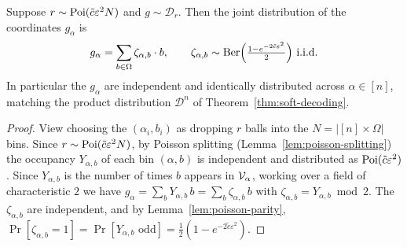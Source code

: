 \begin{lemma}
  \label{claim:poisson-decouple}
  Suppose $r \sim \operatorname{Poi}(\tilde c\varepsilon^2 N)$ and $g \sim \mathcal{D}_r$. Then
  the joint distribution of the coordinates $g_\alpha$ is
  \[
    g_\alpha = \sum_{b\in\Omega}\zeta_{\alpha,b}\cdot b,\qquad
    \zeta_{\alpha,b}\sim\operatorname{Ber}\!\Big(\tfrac{1 - e^{-2\tilde c\varepsilon^2}}{2}\Big)
    \text{ i.i.d.}
  \]
  In particular the $g_\alpha$ are independent and identically distributed across
  $\alpha\in[n]$, matching the product distribution $\mathcal{D}^n$ of
  Theorem~\ref{thm:soft-decoding}.
\end{lemma}
\begin{proof}
  View choosing the $(\alpha_i,b_i)$ as dropping $r$ balls into the
  $N = |[n]\times\Omega|$ bins. Since $r \sim \operatorname{Poi}(\tilde c\varepsilon^2 N)$, by
  Poisson splitting (Lemma~\ref{lem:poisson-splitting}) the occupancy
  $Y_{\alpha,b}$ of each bin $(\alpha,b)$ is independent and distributed as
  $\operatorname{Poi}(\tilde c\varepsilon^2)$. Since $Y_{\alpha,b}$ is the number of times $b$
  appears in $\mathcal{V}_\alpha$, working over a field of characteristic $2$ we have
  $g_\alpha = \sum_b Y_{\alpha,b}\,b = \sum_b \zeta_{\alpha,b}\,b$ with
  $\zeta_{\alpha,b} = Y_{\alpha,b}\bmod 2$. The $\zeta_{\alpha,b}$ are
  independent, and by Lemma~\ref{lem:poisson-parity},
  $\Pr[\zeta_{\alpha,b} = 1] = \Pr[Y_{\alpha,b}\text{ odd}] =
  \frac12(1 - e^{-2\tilde c\varepsilon^2})$.
\end{proof}

